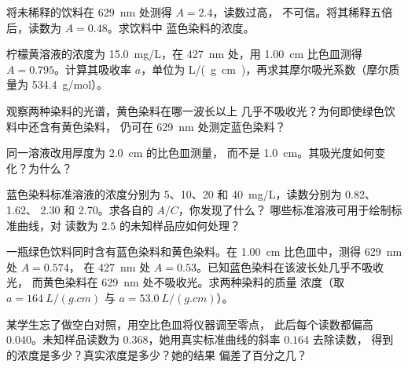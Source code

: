 \begin{exercise}[$\star\star$]\label{exo:g11:absorbance:8}
将未稀释的饮料在 \qty{629}{nm} 处测得 $A = 2.4$，读数过高，
不可信。将其稀释五倍后，读数为 $A = 0.48$。求饮料中
蓝色染料的浓度。
\end{exercise}

\begin{exercise}[$\star\star$]\label{exo:g11:absorbance:9}
柠檬黄溶液的浓度为 \qty{15.0}{mg/L}，在
\qty{427}{nm} 处，用 \qty{1.00}{cm} 比色皿测得 $A = 0.795$。计算其吸收率 $a$，单位为
\si{L/(g.cm)}，再求其摩尔吸光系数（摩尔质量为
\qty{534.4}{g/mol}）。
\end{exercise}

\begin{exercise}[$\star\star$]\label{exo:g11:absorbance:10}
观察两种染料的光谱，黄色染料在哪一波长以上
几乎不吸收光？为何即使绿色饮料中还含有黄色染料，
仍可在 \qty{629}{nm} 处测定蓝色染料？
\end{exercise}

\begin{exercise}[$\star\star$]\label{exo:g11:absorbance:11}
同一溶液改用厚度为 \qty{2.0}{cm} 的比色皿测量，
而不是 \qty{1.0}{cm}。其吸光度如何变化？为什么？
\end{exercise}

\begin{exercise}[$\star\star\star$]\label{exo:g11:absorbance:12}
蓝色染料标准溶液的浓度分别为 5、10、20 和 \qty{40}{mg/L}，读数分别为 0.82、1.62、
2.30 和 2.70。求各自的 $A / C$，你发现了什么？
哪些标准溶液可用于绘制标准曲线，对
读数为 $2.5$ 的未知样品应如何处理？
\end{exercise}

\begin{exercise}[$\star\star\star$]\label{exo:g11:absorbance:13}
一瓶绿色饮料同时含有蓝色染料和黄色染料。在
\qty{1.00}{cm} 比色皿中，测得 \qty{629}{nm} 处 $A = 0.574$，
在 \qty{427}{nm} 处 $A = 0.53$。已知蓝色染料在该波长处几乎不吸收光，
而黄色染料在 \qty{629}{nm} 处不吸收光。求两种染料的质量
浓度（取 $a = \qty{164}{L/(g.cm)}$ 与
$a = \qty{53.0}{L/(g.cm)}$）。
\end{exercise}

\begin{exercise}[$\star\star\star$]\label{exo:g11:absorbance:14}
某学生忘了做空白对照，用空比色皿将仪器调至零点，
此后每个读数都偏高 \num{0.040}。未知样品读数为
$0.368$，她用真实标准曲线的斜率 $0.164$ 去除读数，
得到的浓度是多少？真实浓度是多少？她的结果
偏差了百分之几？
\end{exercise}

